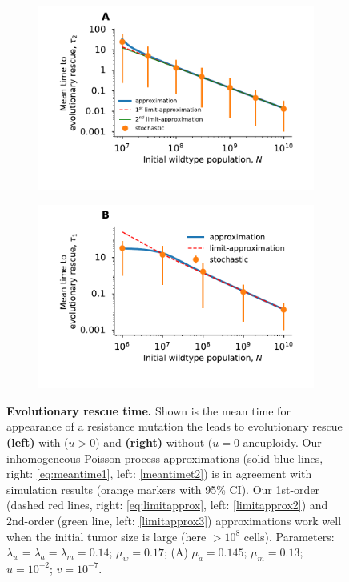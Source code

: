 \documentclass[12pt]{extarticle}
\begin{document}
\begin{figure}
\begin{subfigure}{0.5\textwidth}
\includegraphics[width=1\textwidth]{Figures/MeanTimeDeleteriousPlot.pdf}
\end{subfigure}
\begin{subfigure}{0.5\textwidth}
\includegraphics[width=1\textwidth]{Figures/MeanTimeGrowthMutantDirectPlot.pdf}
\end{subfigure}
\caption{\textbf{Evolutionary rescue time.}
Shown is the mean time for appearance of a resistance mutation the leads to evolutionary rescue \textbf{(left)} with ($u>0$) and \textbf{(right)} without ($u=0$ aneuploidy.
Our inhomogeneous Poisson-process approximations (solid blue lines, right: \cref{eq:meantime1}, left: \cref{meantimet2}) is in agreement with simulation results (orange markers with 95\% CI).
Our 1st-order (dashed red lines, right: \cref{eq:limitapprox}, left: \cref{limitapprox2}) and 2nd-order (green line, left: \cref{limitapprox3}) approximations work well when the initial tumor size is large (here $>10^8$ cells).
Parameters: $\lambda_w=\lambda_a=\lambda_m=0.14$; $\mu_w=0.17$; (A) $\mu_a=0.145$; $\mu_m=0.13$; $u=10^{-2}$; $v=10^{-7}$.
}
\label{MeanTimeGrowthAneuploidyPlot} 
\end{figure}
\end{document}
